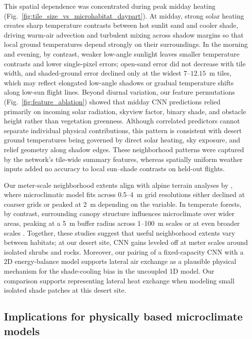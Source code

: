 \documentclass[12pt]{article}
\begin{document}
This spatial dependence was concentrated during peak midday heating (Fig.~\ref{fig:tile_size_vs_microhabitat_daypart}). At midday, strong solar heating creates sharp temperature contrasts between hot sunlit sand and cooler shade, driving warm-air advection and turbulent mixing across shadow margins so that local ground temperatures depend strongly on their surroundings. In the morning and evening, by contrast, weaker low-angle sunlight leaves smaller temperature contrasts and lower single-pixel errors; open-sand error did not decrease with tile width, and shaded-ground error declined only at the widest $7$--$12.15$~m tiles, which may reflect elongated low-angle shadows or gradual temperature shifts along low-sun flight lines. Beyond diurnal variation, our feature permutations (Fig.~\ref{fig:feature_ablation}) showed that midday CNN predictions relied primarily on incoming solar radiation, skyview factor, binary shade, and obstacle height rather than vegetation greenness. Although correlated predictors cannot separate individual physical contributions, this pattern is consistent with desert ground temperatures being governed by direct solar heating, sky exposure, and relief geometry along shadow edges. These neighborhood patterns were captured by the network's tile-wide summary features, whereas spatially uniform weather inputs added no accuracy to local sun--shade contrasts on held-out flights.

Our meter-scale neighborhood extents align with alpine terrain analyses by \citet{leempoel_2015}, where microclimatic model fits across 0.5--4~m grid resolutions either declined at coarser grids or peaked at 2~m depending on the variable. In temperate forests, by contrast, surrounding canopy structure influences microclimate over wider areas, peaking at a 5~m buffer radius across 1--100~m scales \citep{gril_2023} or at even broader scales \citep{kaspar_2021}. Together, these studies suggest that useful neighborhood extents vary between habitats; at our desert site, CNN gains leveled off at meter scales around isolated shrubs and rocks. Moreover, our pairing of a fixed-capacity CNN with a 2D energy-balance model supports lateral air exchange as a plausible physical mechanism for the shade-cooling bias in the uncoupled 1D model. Our comparison supports representing lateral heat exchange when modeling small isolated shade patches at this desert site.

\subsection{Implications for physically based microclimate models}
\end{document}
